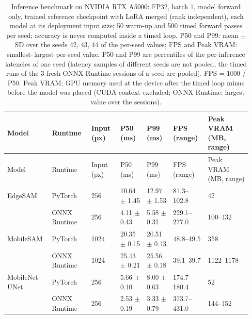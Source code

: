 \documentclass[10pt]{article}
\begin{document}
\begin{landscape}
{\scriptsize
\begin{longtable}{lllllll}
\caption{Inference benchmark on NVIDIA RTX A5000: FP32, batch 1, model forward only, trained reference checkpoint with LoRA merged (rank independent), each model at its deployment input size; 50 warm-up and 500 timed forward passes per seed; accuracy is never computed inside a timed loop. P50 and P99: mean $\pm$ SD over the seeds 42, 43, 44 of the per-seed values; FPS and Peak VRAM: smallest--largest per-seed value. P50 and P99 are percentiles of the per-inference latencies of one seed (latency samples of different seeds are not pooled; the timed runs of the 3 fresh ONNX Runtime sessions of a seed are pooled). FPS = 1000 / P50. Peak VRAM: GPU memory used at the device after the timed loop minus before the model was placed (CUDA context excluded; ONNX Runtime: largest value over the sessions).}\label{tab:bench}\\
\toprule
Model & Runtime & Input (px) & P50 (ms) & P99 (ms) & FPS (range) & Peak VRAM (MB, range) \\
\midrule
\endfirsthead
\toprule
Model & Runtime & Input (px) & P50 (ms) & P99 (ms) & FPS (range) & Peak VRAM (MB, range) \\
\midrule
\endhead
\bottomrule
\endfoot
EdgeSAM & PyTorch & 256 & 10.64 $\pm$ 1.45 & 12.97 $\pm$ 1.53 & 81.3--102.8 & 42 \\
 & ONNX Runtime & 256 & 4.11 $\pm$ 0.43 & 5.58 $\pm$ 0.31 & 229.1--277.0 & 100--132 \\
MobileSAM & PyTorch & 1024 & 20.35 $\pm$ 0.15 & 20.51 $\pm$ 0.13 & 48.8--49.5 & 358 \\
 & ONNX Runtime & 1024 & 25.43 $\pm$ 0.21 & 25.56 $\pm$ 0.18 & 39.1--39.7 & 1122--1178 \\
MobileNet-UNet & PyTorch & 256 & 5.66 $\pm$ 0.10 & 8.00 $\pm$ 0.63 & 174.7--180.4 & 52 \\
 & ONNX Runtime & 256 & 2.53 $\pm$ 0.19 & 3.33 $\pm$ 0.79 & 373.7--431.0 & 144--152 \\
\end{longtable}
}


\end{landscape}
\end{document}
